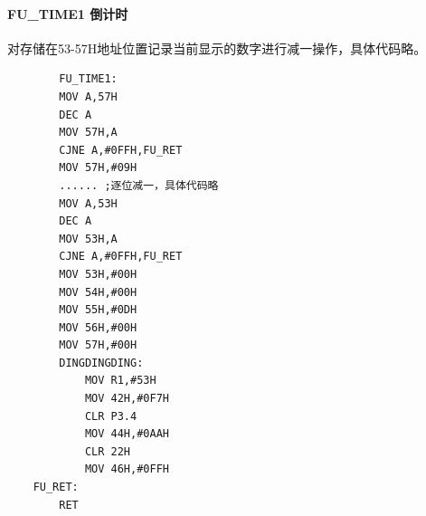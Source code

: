 \documentclass{article}
\begin{document}
\paragraph*{FU\_TIME1 倒计时}
对存储在53-57H地址位置记录当前显示的数字进行减一操作，具体代码略。
\begin{multicols}{3}
    \begin{lstlisting}
        FU_TIME1:
        MOV A,57H
        DEC A
        MOV 57H,A
        CJNE A,#0FFH,FU_RET
        MOV 57H,#09H
        ...... ;逐位减一，具体代码略
        MOV A,53H
        DEC A
        MOV 53H,A
        CJNE A,#0FFH,FU_RET
        MOV 53H,#00H
        MOV 54H,#00H
        MOV 55H,#0DH
        MOV 56H,#00H
        MOV 57H,#00H
        DINGDINGDING:
            MOV R1,#53H
            MOV 42H,#0F7H
            CLR P3.4
            MOV 44H,#0AAH
            CLR 22H
            MOV 46H,#0FFH
    FU_RET:
        RET
    \end{lstlisting}    
\end{multicols}
\end{document}
